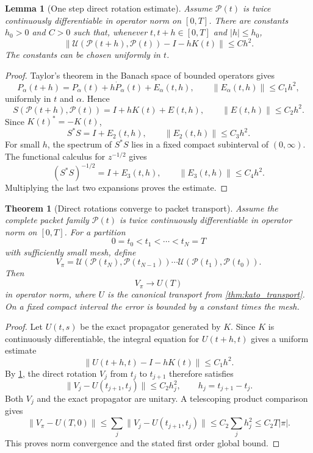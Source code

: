 \documentclass{aomart}
\newtheorem{theorem}{Theorem}[section]
\newtheorem{lemma}[lemma]{Lemma}
\theoremstyle{definition}
\theoremstyle{remark}
\newcommand{\Pcal}{\mathcal P}
\newcommand{\Ucal}{\mathcal U}
\begin{document}
\begin{lemma}[One step direct rotation estimate]\label{lem:one_step_direct_rotation}
Assume $\Pcal(t)$ is twice continuously differentiable in operator norm on $[0,T]$.  There are constants $h_0>0$ and $C>0$ such that, whenever $t,t+h\in[0,T]$ and $|h|\le h_0$,
\[
\left\|
\Ucal(\Pcal(t+h),\Pcal(t))
-
I
-
hK(t)
\right\|
\le
Ch^2.
\]
The constants can be chosen uniformly in $t$.
\end{lemma}

\begin{proof}
Taylor's theorem in the Banach space of bounded operators gives
\[
P_\alpha(t+h)
=
P_\alpha(t)+h\dot P_\alpha(t)+E_{\alpha}(t,h),
\qquad
\|E_{\alpha}(t,h)\|\le C_1h^2,
\]
uniformly in $t$ and $\alpha$.  Hence
\[
S(\Pcal(t+h),\Pcal(t))
=
I+hK(t)+E(t,h),
\qquad
\|E(t,h)\|\le C_2h^2.
\]
Since $K(t)^*=-K(t)$,
\[
S^*S=I+E_2(t,h),
\qquad
\|E_2(t,h)\|\le C_3h^2.
\]
For small $h$, the spectrum of $S^*S$ lies in a fixed compact subinterval of $(0,\infty)$.  The functional calculus for $z^{-1/2}$ gives
\[
(S^*S)^{-1/2}=I+E_3(t,h),
\qquad
\|E_3(t,h)\|\le C_4h^2.
\]
Multiplying the last two expansions proves the estimate.
\end{proof}

\begin{theorem}[Direct rotations converge to packet transport]\label{thm:direct_rotation_convergence}
Assume the complete packet family $\Pcal(t)$ is twice continuously differentiable in operator norm on $[0,T]$.  For a partition
\[
0=t_0<t_1<\cdots<t_N=T
\]
with sufficiently small mesh, define
\[
V_\pi
=
\Ucal(\Pcal(t_N),\Pcal(t_{N-1}))
\cdots
\Ucal(\Pcal(t_1),\Pcal(t_0)).
\]
Then
\[
V_\pi\longrightarrow U(T)
\]
in operator norm, where $U$ is the canonical transport from \cref{thm:kato_transport}.  On a fixed compact interval the error is bounded by a constant times the mesh.
\end{theorem}

\begin{proof}
Let $U(t,s)$ be the exact propagator generated by $K$.  Since $K$ is continuously differentiable, the integral equation for $U(t+h,t)$ gives a uniform estimate
\[
\|U(t+h,t)-I-hK(t)\|
\le
C_1h^2.
\]
By \cref{lem:one_step_direct_rotation}, the direct rotation $V_j$ from $t_j$ to $t_{j+1}$ therefore satisfies
\[
\|V_j-U(t_{j+1},t_j)\|
\le
C_2h_j^2,
\qquad
h_j=t_{j+1}-t_j.
\]
Both $V_j$ and the exact propagator are unitary.  A telescoping product comparison gives
\[
\|V_\pi-U(T,0)\|
\le
\sum_j\|V_j-U(t_{j+1},t_j)\|
\le
C_2\sum_jh_j^2
\le
C_2T|\pi|.
\]
This proves norm convergence and the stated first order global bound.
\end{proof}
\end{document}
